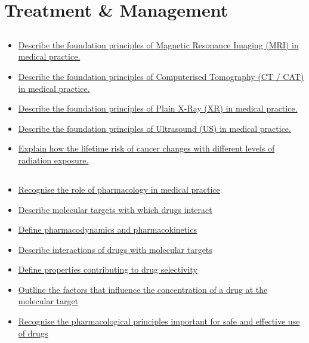 \documentclass[10pt, a4paper]{article}
\begin{document}
\section{Treatment \& Management}
\subsection{} \begin{itemize} \item \href{https://www.notion.so/74daedc4ae024b5189b80f31e8d2c850}{Describe the foundation principles of Magnetic Resonance Imaging (MRI) in medical practice.} \item \href{https://www.notion.so/c34fa2b1bb374d7d84cc19dc7e42ba3b}{Describe the foundation principles of Computerised Tomography (CT / CAT) in medical practice.} \item \href{https://www.notion.so/a6c81d9f23284e9cba5eee2b0a666525}{Describe the foundation principles of Plain X-Ray (XR) in medical practice.} \item \href{https://www.notion.so/eda0bd37561d47d6b550057fb35aff16}{Describe the foundation principles of Ultrasound (US) in medical practice.} \item \href{https://www.notion.so/11df6ad110cf4004a3eea61f194ffd57}{Explain how the lifetime risk of cancer changes with different levels of radiation exposure.} \end{itemize}
\subsection{} \begin{itemize} \item \href{https://www.notion.so/0d9728bd486748748d1edb37015b765a}{Recognise the role of pharmacology in medical practice } \item \href{https://www.notion.so/37980077c0334a19b4c72f69d3e4b1a1}{Describe molecular targets with which drugs interact } \item \href{https://www.notion.so/703cd2adfd2f433e82ea54c4eda89bd1}{Define pharmacodynamics and pharmacokinetics } \item \href{https://www.notion.so/d99abf1028e64baf8ed3331694f66cbb}{Describe interactions of drugs with molecular targets } \item \href{https://www.notion.so/b1532116547741739ec59b2a52f3923e}{Define properties contributing to drug selectivity} \item \href{https://www.notion.so/97b14e29444b44a1bf698496d626fda2}{Outline the factors that influence the concentration of a drug at the molecular target} \item \href{https://www.notion.so/3013c17e5133419f944fa9aab3690ae8}{Recognise the pharmacological principles important for safe and effective use of drugs } \end{itemize}
\end{document}
